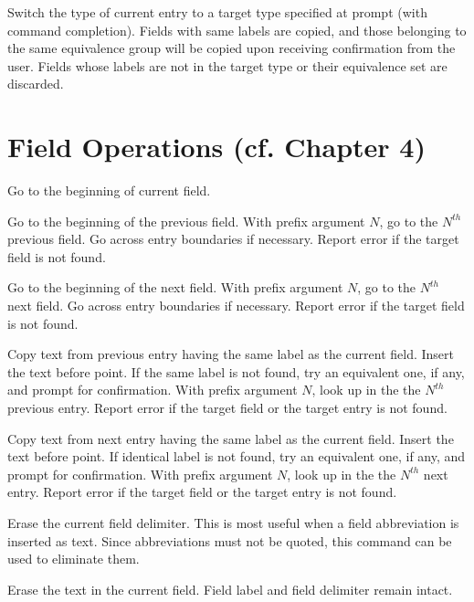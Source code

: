 Switch the type of current entry to a target type specified at prompt
(with command completion).  Fields with same labels are copied,
and those belonging to the same equivalence group will be
copied upon receiving confirmation from the user.
Fields whose labels are not in the target type or their
equivalence set are discarded.


\section{Field Operations (cf. Chapter 4)}

Go to the beginning of current field.

Go to the beginning of the previous field.
With prefix argument $N$, go to the $N^{th}$ previous field.
Go across entry boundaries if necessary.
Report error if the target field is not found.

Go to the beginning of the next field.
With prefix argument $N$, go to the $N^{th}$ next field.
Go across entry boundaries if necessary.
Report error if the target field is not found.

Copy text from previous entry having the same label as the current field.
Insert the text before point.  If the same label is not found,
try an equivalent one, if any, and prompt for confirmation.
With prefix argument $N$, look up in the the $N^{th}$ previous entry.
Report error if the target field or the target entry is not found.

Copy text from next entry having the same label as the current field.
Insert the text before point.  If identical label is not found,
try an equivalent one, if any, and prompt for confirmation.
With prefix argument $N$, look up in the the $N^{th}$ next entry.
Report error if the target field or the target entry is not found.

Erase the current field delimiter.  This is most useful
when a field abbreviation is inserted as text.  Since
abbreviations must not be quoted, this command can be used to
eliminate them.

Erase the text in the current field.  Field label and field
delimiter remain intact.

